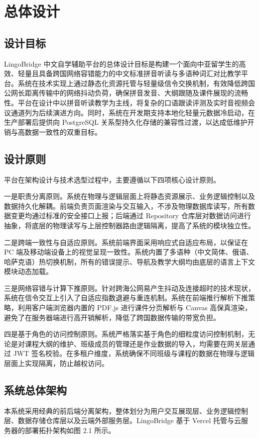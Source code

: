 \chapter{总体设计}

\section{设计目标}
LingoBridge 中文自学辅助平台的总体设计目标是构建一个面向中亚留学生的高效、轻量且具备跨国网络容错能力的中文标准拼音听读与多语种词汇对比教学平台。系统在技术实现上通过静态化资源托管与轻量级信令交换机制，有效降低跨国公网长距离传输中的网络抖动负荷，确保拼音发音、大纲跟随及课件展现的流畅性。平台在设计中以拼音听读教学为主线，将复杂的口语跟读评测及实时音视频会议通道列为后续演进方向。同时，系统在开发期支持本地化轻量元数据冷启动，在生产部署后提供向 PostgreSQL 关系型持久化存储的兼容性过渡，以达成低维护开销与高数据一致性的双重目标。

\section{设计原则}
平台在架构设计与技术选型过程中，主要遵循以下四项核心设计原则。

一是职责分离原则。系统在物理与逻辑层面上将静态资源展示、业务逻辑控制以及数据持久化解耦。前端负责页面渲染与交互输入，不涉及物理数据库读写，所有数据变更均通过标准的安全接口上报；后端通过 Repository 仓库层对数据访问进行抽象，将底层的物理读写与上层控制器路由逻辑隔离，提高了系统的模块独立性。

二是跨端一致性与自适应原则。系统前端界面采用响应式自适应布局，以保证在 PC 端及移动端设备上的视觉呈现一致性。系统内置了多语种（中文简体、俄语、哈萨克语）热切换机制，所有的错误提示、导航及教学大纲均由底层的语言上下文模块动态加载。

三是网络容错与计算下推原则。针对跨海公网易产生抖动及连接超时的技术现状，系统在信令交互上引入了自适应指数退避与重连机制。系统在前端推行解析下推策略，利用客户端浏览器内置的 PDF.js 进行课件分页解析与 Canvas 高保真渲染，避免了在服务器端进行高开销解析，降低了跨国数据传输的带宽负担。

四是基于角色的访问控制原则。系统严格落实基于角色的细粒度访问控制机制，无论是对课程大纲的维护、班级成员的管理还是作业数据的导入，均需要在网关层通过 JWT 签名校验。在多租户维度，系统确保不同班级与课程的数据在物理与逻辑层面上实现隔离，防止越权访问。

\section{系统总体架构}
本系统采用经典的前后端分离架构，整体划分为用户交互展现层、业务逻辑控制层、数据存储仓库层以及云端外部服务层。LingoBridge 基于 Vercel 托管与云服务器的部署拓扑架构如图 2.1 所示。

